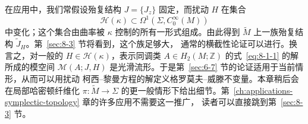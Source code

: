 在应用中，我们常假设殆复结构 $J=\{J_z\}$ 固定，而扰动 $H$ 在集合
\[
  \mathcal H(\kappa)\subset\Omega^1(\Sigma,C_0^\infty(M))
\]
中变化；这个集合由曲率被 $\kappa$ 控制的所有一形式组成。由此得到
$\widetilde M$ 上一族殆复结构 $\widetilde J_H$。第~\ref{sec:8-3} 节将看到，这个族足够大，
通常的横截性论证可以进行。换言之，对一般的 $H\in\mathcal H(\kappa)$，表示同调类
$A\in H_2(M;\mathbb Z)$ 的式~\eqref{eq:8-1-1} 的解所成的模空间
$\mathcal M(A;J,H)$ 是光滑流形。于是第~\ref{sec:6-7} 节的论证适用于当前情形，从而可以用扰动
柯西--黎曼方程的解定义格罗莫夫--威滕不变量。本章稍后会在局部哈密顿纤维化
$\pi:\widetilde M\to\Sigma$ 的更一般情形下给出细节。第~\ref{ch:applications-symplectic-topology} 章的许多应用不需要这一推广，
读者可以直接跳到第~\ref{sec:8-3} 节。
